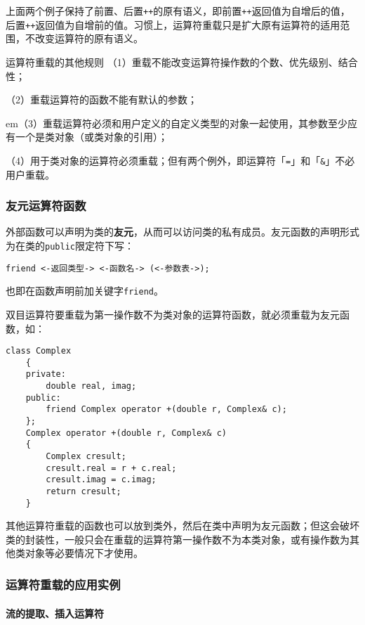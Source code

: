 \documentclass[10pt, a4paper, oneside, fontset=none]{ctexart}
\theoremstyle{plain}
\theoremstyle{definition}
\newcommand{\colors}[1]{\color{#1!75!black}}
\newcommand{\hang}[1][1]{\hangafter 1 \hangindent #1em}
\newcommand{\zhu}[2][]{\begin{note}{#1}\xiu #2\end{note}}
\newcommand{\tboba}[1]{\textbf{\kai\color{bali!75!black}#1}}
\begin{document}
上面两个例子保持了前置、后置\texttt{++}的原有语义，即前置\texttt{++}返回值为自增后的值，后置\texttt{++}返回值为自增前的值。习惯上，运算符重载只是扩大原有运算符的适用范围，不改变运算符的原有语义。

\zhu[运算符重载的其他规则]{
	（1）重载不能改变运算符操作数的个数、优先级别、结合性；

	（2）重载运算符的函数不能有默认的参数；

	\hang[2]（3）重载运算符必须和用户定义的自定义类型的对象一起使用，其参数至少应有一个是类对象（或类对象的引用）；

	（4）用于类对象的运算符必须重载；但有两个例外，即运算符「\texttt{=}」和「\texttt{\&}」不必用户重载。
}

\subsubsection{友元运算符函数}

外部函数可以声明为类的\tboba{友元}，从而可以访问类的私有成员。友元函数的声明形式为在类的\texttt{public}限定符下写：
\begin{lstlisting}[style=intro]
	friend <-返回类型-> <-函数名-> (<-参数表->);
\end{lstlisting}
也即在函数声明前加关键字\texttt{friend}。

双目运算符要重载为第一操作数不为类对象的运算符函数，就必须重载为友元函数，如：
\begin{lstlisting}[moreemph={Complex}, emphstyle=\colors{qinglv}, moreemph={[2]{real, imag, c, cresult, r}}, emphstyle={[2]\it\ttfamily},]
	class Complex
	{
	private:
		double real, imag;
	public:
		friend Complex operator +(double r, Complex& c);
	};
	Complex operator +(double r, Complex& c)
	{
		Complex cresult;
		cresult.real = r + c.real;
		cresult.imag = c.imag;
		return cresult;
	}
\end{lstlisting}
其他运算符重载的函数也可以放到类外，然后在类中声明为友元函数；但这会破坏类的封装性，一般只会在重载的运算符第一操作数不为本类对象，或有操作数为其他类对象等必要情况下才使用。

\subsubsection{运算符重载的应用实例}\label{ssSec: 运算符重载的应用实例}

\paragraph{流的提取、插入运算符}\label{Par: 流的提取、插入运算符}
\end{document}
